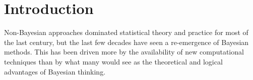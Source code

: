 \documentclass[british]{scrreprt}
\begin{document}
\tableofcontents


\chapter{Introduction}
\label{ch:introduction}
\begin{displayquote}
    Non-Bayesian approaches dominated statistical theory and practice for most of the last century, but the last few decades have seen a re-emergence of Bayesian methods. This has been driven more by the availability of new computational techniques than by what many would see as the theoretical and logical advantages of Bayesian thinking.
\end{displayquote}
\end{document}
